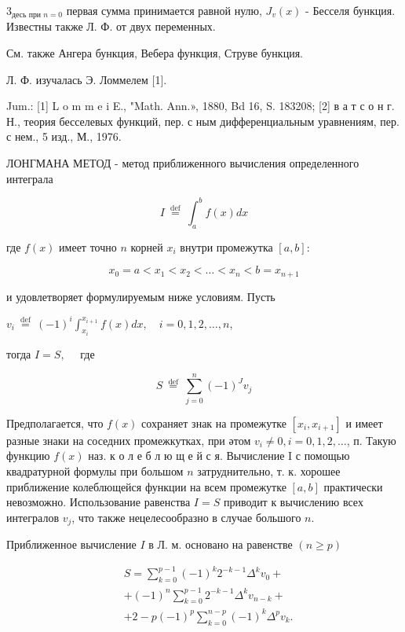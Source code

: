 \documentclass[10pt]{article}
\begin{document}
$3_{\text {десь при } n=0}$ первая сумма принимается равной нулю, $J_{v}(x)$ - Бесселя бункция. Известны также Л. Ф. от двух переменных.



См. также Ангера бункция, Вебера функция, Струве бункция.



Л. Ф. изучалась Э. Ломмелем [1].



Jum.: [1] L o m m e i E., "Math. Ann.», 1880, Bd 16, S. 183208; [2] в а т с о н г. Н., теория бесселевых функций, пер. с ным дифференциальным уравнениям, пер. с нем., 5 изд., М., 1976.



ЛОНГМАНА МЕТОД - метод приближенного вычисления определенного интеграла



\[

I \stackrel{\text { def }}{=} \int_{a}^{b} f(x) d x

\]



где $f(x)$ имеет точно $n$ корней $x_{i}$ внутри промежутка $[a, b]:$



\[

x_{0}=a<x_{1}<x_{2}<\ldots<x_{n}<b=x_{n+1}

\]



и удовлетворяет формулируемым ниже условиям. Пусть



$v_{i} \stackrel{\text { def }}{=}(-1)^{i} \int_{x_{i}}^{x_{i+1}} f(x) d x, \quad i=0,1,2, \ldots, n$,



тогда $I=S, \quad$ где



\[

S \stackrel{\text { def }}{=} \sum_{j=0}^{n}(-1)^{J} v_{j}

\]



Предполагается, что $f(x)$ сохраняет знак на промежутке $\left[x_{i}, x_{i+1}\right]$ и имеет разные знаки на соседних промежкутках, при әтом $v_{i} \neq 0, i=0,1,2, \ldots$, п. Такую функцию $f(x)$ наз. к о л е б л ю щ е й с я. Вычисление I с помощью квадратурной формулы при большом $n$ затруднительно, т. к. хорошее приближение колеблющейся функции на всем промежутке $[a, b]$ практически невозможно. Использование равенства $I=S$ приводит к вычислению всех интегралов $v_{j}$, что также нецелесообразно в случае большого $n$.



Приближенное вычисление $I$ в Л. м. основано на равенстве $(n \geqslant p)$



\[

\begin{aligned}

& S=\sum_{k=0}^{p-1}(-1)^{k} 2^{-k-1} \Delta^{k} v_{0}+ \\

& +(-1)^{n} \sum_{k=0}^{p-1} 2^{-k-1} \Delta^{k} v_{n-k}+ \\

& +2-p(-1)^{p} \sum_{k=0}^{n-p}(-1)^{k} \Delta^{p} v_{k} .

\end{aligned}

\]
\end{document}

